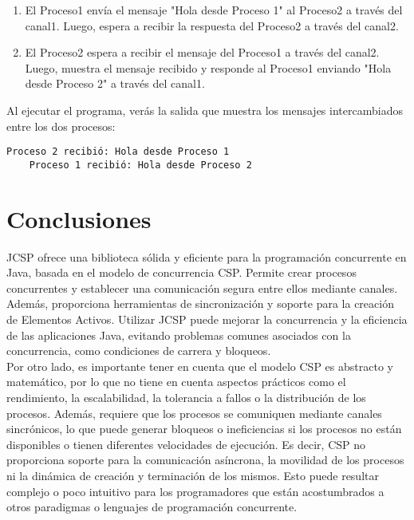 \begin{enumerate}
	\item El Proceso1 envía el mensaje "Hola desde Proceso 1" al Proceso2 a través del canal1. Luego, espera a recibir la respuesta del Proceso2 a través del canal2.
	
	\item El Proceso2 espera a recibir el mensaje del Proceso1 a través del canal2. Luego, muestra el mensaje recibido y responde al Proceso1 enviando "Hola desde Proceso 2" a través del canal1.
\end{enumerate}

\noindent Al ejecutar el programa, verás la salida que muestra los mensajes intercambiados entre los dos procesos:

\begin{lstlisting}[frame=single, caption={Salida en termianl}]
	Proceso 2 recibió: Hola desde Proceso 1
	Proceso 1 recibió: Hola desde Proceso 2
\end{lstlisting}
\section*{Conclusiones}
JCSP ofrece una biblioteca sólida y eficiente para la programación concurrente en Java, basada en el modelo de concurrencia CSP. Permite crear procesos concurrentes y establecer una comunicación segura entre ellos mediante canales. Además, proporciona herramientas de sincronización y soporte para la creación de Elementos Activos. Utilizar JCSP puede mejorar la concurrencia y la eficiencia de las aplicaciones Java, evitando problemas comunes asociados con la concurrencia, como condiciones de carrera y bloqueos.\\
Por otro lado, es importante tener en cuenta que el modelo CSP es abstracto y matemático, por lo que no tiene en cuenta aspectos prácticos como el rendimiento, la escalabilidad, la tolerancia a fallos o la distribución de los procesos. Además, requiere que los procesos se comuniquen mediante canales sincrónicos, lo que puede generar bloqueos o ineficiencias si los procesos no están disponibles o tienen diferentes velocidades de ejecución. Es decir, CSP no proporciona soporte para la comunicación asíncrona, la movilidad de los procesos ni la dinámica de creación y terminación de los mismos. Esto puede resultar complejo o poco intuitivo para los programadores que están acostumbrados a otros paradigmas o lenguajes de programación concurrente.